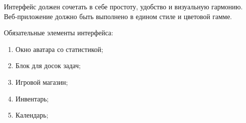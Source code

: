 \documentclass[../document.tex]{subfiles}
\begin{document}
\par Интерфейс должен сочетать в себе простоту, удобство и визуальную гармонию. Веб-приложение должно быть выполнено в едином стиле и цветовой гамме.
\par Обязательные элементы интерфейса:
\begin{enumerate}
  \item Окно аватара со статистикой;
  \item Блок для досок задач;
  \item Игровой магазин;
  \item Инвентарь;
  \item Календарь;
\end{enumerate}
\end{document}
